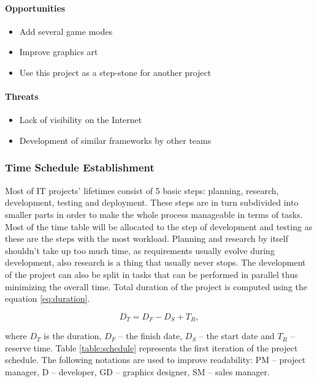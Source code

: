 \paragraph{Opportunities}

\begin{itemize}
    \item Add several game modes
    \item Improve graphics art
    \item Use this project as a step-stone for another project
\end{itemize}

\paragraph{Threats}

\begin{itemize}
    \item Lack of visibility on the Internet
    \item Development of similar frameworks by other teams
\end{itemize}

\subsubsection{Time Schedule Establishment}

Most of IT projects' lifetimes consist of 5 basic steps: planning, research,
development, testing and deployment. These steps are in turn subdivided into
smaller parts in order to make the whole process manageable in terms of tasks.
Most of the time table will be allocated to the step of development and
testing as these are the steps with the most workload. Planning and research
by itself shouldn't take up too much time, as requirements usually evolve
during development, also research is a thing that usually never stops. The
development of the project can also be split in tasks that can be performed in
parallel thus minimizing the overall time. Total duration of the project is
computed using the equation \eqref{eq:duration}.

\begin{equation} \label{eq:duration}
D_T = D_F - D_S + T_R,
\end{equation}

\noindent where $D_T$ is the duration, $D_F$ -- the finish date, $D_S$ -- the
start date and $T_R$ -- reserve time. Table \ref{table:schedule} represents
the first iteration of the project schedule. The following notations are used
to improve readability: PM -- project manager, D -- developer, GD -- graphics
designer, SM -- sales manager.

